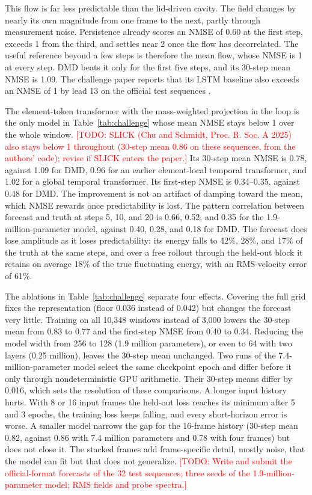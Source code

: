 \documentclass[conf]{new-aiaa}
\newcommand{\todo}[1]{\textcolor{red}{[TODO: #1]}}
\begin{document}
This flow is far less predictable than the lid-driven cavity. The field changes by nearly its own magnitude from one frame to the next, partly through measurement noise. Persistence already scores an NMSE of 0.60 at the first step, exceeds 1 from the third, and settles near 2 once the flow has decorrelated. The useful reference beyond a few steps is therefore the mean flow, whose NMSE is 1 at every step. DMD beats it only for the first five steps, and its 30-step mean NMSE is 1.09. The challenge paper reports that its LSTM baseline also exceeds an NMSE of 1 by lead 13 on the official test sequences \cite{schmidt2026challenge}.

The element-token transformer with the mass-weighted projection in the loop is the only model in Table~\ref{tab:challenge} whose mean NMSE stays below 1 over the whole window. \todo{SLICK (Chu and Schmidt, Proc. R. Soc. A 2025) also stays below 1 throughout (30-step mean 0.86 on these sequences, from the authors' code); revise if SLICK enters the paper.} Its 30-step mean NMSE is 0.78, against 1.09 for DMD, 0.96 for an earlier element-local temporal transformer, and 1.02 for a global temporal transformer. Its first-step NMSE is 0.34--0.35, against 0.48 for DMD. The improvement is not an artifact of damping toward the mean, which NMSE rewards once predictability is lost. The pattern correlation between forecast and truth at steps 5, 10, and 20 is 0.66, 0.52, and 0.35 for the 1.9-million-parameter model, against 0.40, 0.28, and 0.18 for DMD. The forecast does lose amplitude as it loses predictability: its energy falls to 42\%, 28\%, and 17\% of the truth at the same steps, and over a free rollout through the held-out block it retains on average 18\% of the true fluctuating energy, with an RMS-velocity error of 61\%.

The ablations in Table~\ref{tab:challenge} separate four effects. Covering the full grid fixes the representation (floor 0.036 instead of 0.042) but changes the forecast very little. Training on all 10,348 windows instead of 3,000 lowers the 30-step mean from 0.83 to 0.77 and the first-step NMSE from 0.40 to 0.34. Reducing the model width from 256 to 128 (1.9 million parameters), or even to 64 with two layers (0.25 million), leaves the 30-step mean unchanged. Two runs of the 7.4-million-parameter model select the same checkpoint epoch and differ before it only through nondeterministic GPU arithmetic. Their 30-step means differ by 0.016, which sets the resolution of these comparisons. A longer input history hurts. With 8 or 16 input frames the held-out loss reaches its minimum after 5 and 3 epochs, the training loss keeps falling, and every short-horizon error is worse. A smaller model narrows the gap for the 16-frame history (30-step mean 0.82, against 0.86 with 7.4 million parameters and 0.78 with four frames) but does not close it. The stacked frames add frame-specific detail, mostly noise, that the model can fit but that does not generalize. \todo{Write and submit the official-format forecasts of the 32 test sequences; three seeds of the 1.9-million-parameter model; RMS fields and probe spectra.}
\end{document}
